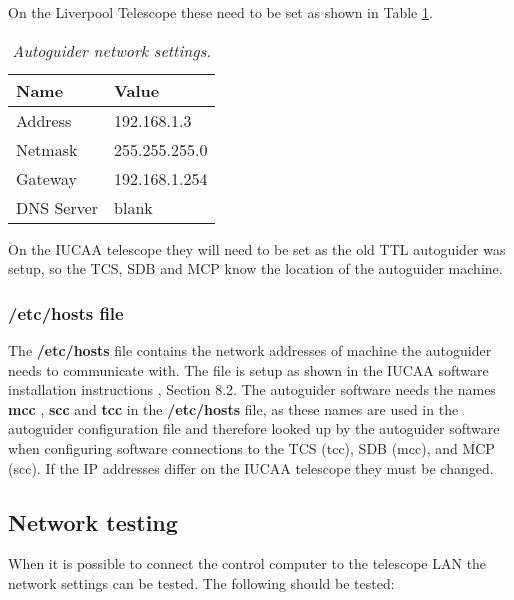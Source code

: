 \documentclass[10pt,a4paper]{article}
\begin{document}
On the Liverpool Telescope these need to be set as shown in Table \ref{tab:autoguidernetworksettings}.

\begin{table}[!h]
\begin{center}
\begin{tabular}{|l|p{20em}|}
\hline
{\bf Name} & {\bf Value}   \\ \hline
Address    & 192.168.1.3   \\ \hline
Netmask    & 255.255.255.0 \\ \hline
Gateway    & 192.168.1.254 \\ \hline
DNS Server & blank         \\ \hline
\end{tabular}
\end{center}
\caption{\em Autoguider network settings.}
\label{tab:autoguidernetworksettings}
\end{table}

On the IUCAA telescope they will need to be set as the old TTL autoguider was setup, so the TCS, SDB and MCP know
the location of the autoguider machine.

\subsubsection{/etc/hosts file}

The {\bf /etc/hosts} file contains the network addresses of machine the autoguider needs to communicate with. The file is setup as shown in the IUCAA software installation instructions \cite{bib:iucaasoftwareinstallation}, Section 8.2. The autoguider software needs the names {\bf mcc} , {\bf scc} and {\bf tcc} in the {\bf /etc/hosts} file, as these names are used in the autoguider configuration file and therefore looked up by the autoguider software when configuring software connections to the TCS (tcc), SDB (mcc), and MCP (scc). If the IP addresses differ on the IUCAA telescope they must be changed.

\subsection{Network testing}
\label{sec:networktesting}

When it is possible to connect the control computer to the telescope LAN the network settings can be tested. The following should be tested:
\end{document}
